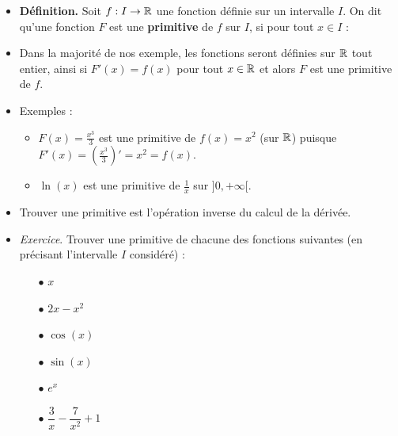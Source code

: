 \documentclass[11pt,class=report,crop=false]{standalone}
\begin{document}
\begin{itemize}
  \item \textbf{Définition.} Soit $f : I \to \mathbb{R}$ une fonction définie sur un intervalle $I$.
On dit qu'une fonction $F$ est une \textbf{primitive} de $f$ sur $I$, si pour tout $x\in I$ :

  \item Dans la majorité de nos exemple, les fonctions seront définies sur $\mathbb{R}$ tout entier, ainsi si $F'(x)=f(x)$ pour tout $x\in \mathbb{R}$ et alors $F$ est une primitive de $f$.  

  \item Exemples :
\begin{itemize}
	\item $F(x)=\displaystyle\frac{x^3}{3}$ est une primitive de $f(x)=x^2$ (sur $\mathbb{R}$) puisque $F'(x) = (\frac{x^3}{3})' = x^2 = f(x)$.
	\item $\ln(x)$ est une primitive de $\frac1x$ sur $]0,+\infty[$.
\end{itemize}

  \item Trouver une primitive est l'opération inverse du calcul de la dérivée.

  \item \emph{Exercice}. Trouver une primitive de chacune des fonctions suivantes (en précisant l'intervalle $I$ considéré) :
\begin{multicols}{2}
\begin{itemize}
	\item[$\bullet$] $x$
    \item[$\bullet$] $2x - x^2$
    \item[$\bullet$] $\cos(x)$
    \item[$\bullet$] $\sin(x)$
    \item[$\bullet$] $e^{x}$
    \item[$\bullet$] $\dfrac3x - \dfrac{7}{x^2} + 1$

\end{itemize}
\end{multicols}
\end{itemize}
\end{document}
